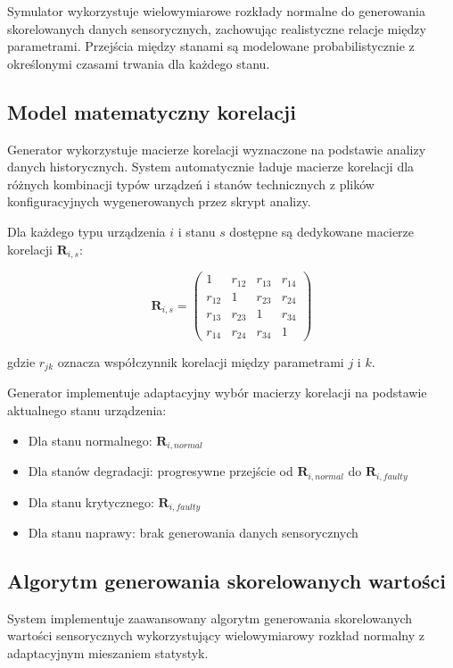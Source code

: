 Symulator wykorzystuje wielowymiarowe rozkłady normalne do generowania skorelowanych danych sensorycznych, zachowując realistyczne relacje między parametrami. Przejścia między stanami są modelowane probabilistycznie z określonymi czasami trwania dla każdego stanu.


\subsection{Model matematyczny korelacji}
\label{subsec:model_korelacji}

Generator wykorzystuje macierze korelacji wyznaczone na podstawie analizy danych historycznych. System automatycznie ładuje macierze korelacji dla różnych kombinacji typów urządzeń i stanów technicznych z plików konfiguracyjnych wygenerowanych przez skrypt analizy.

Dla każdego typu urządzenia $i$ i stanu $s$ dostępne są dedykowane macierze korelacji $\mathbf{R}_{i,s}$:

$$\mathbf{R}_{i,s} = \begin{pmatrix}
1 & r_{12} & r_{13} & r_{14} \\
r_{12} & 1 & r_{23} & r_{24} \\
r_{13} & r_{23} & 1 & r_{34} \\
r_{14} & r_{24} & r_{34} & 1
\end{pmatrix}$$

gdzie $r_{jk}$ oznacza współczynnik korelacji między parametrami $j$ i $k$.

Generator implementuje adaptacyjny wybór macierzy korelacji na podstawie aktualnego stanu urządzenia:
\begin{itemize}
    \item Dla stanu normalnego: $\mathbf{R}_{i,normal}$
    \item Dla stanów degradacji: progresywne przejście od $\mathbf{R}_{i,normal}$ do $\mathbf{R}_{i,faulty}$
    \item Dla stanu krytycznego: $\mathbf{R}_{i,faulty}$
    \item Dla stanu naprawy: brak generowania danych sensorycznych
\end{itemize}

\subsection{Algorytm generowania skorelowanych wartości}
\label{subsec:algorytm_generowania}

System implementuje zaawansowany algorytm generowania skorelowanych wartości sensorycznych wykorzystujący wielowymiarowy rozkład normalny z adaptacyjnym mieszaniem statystyk.

